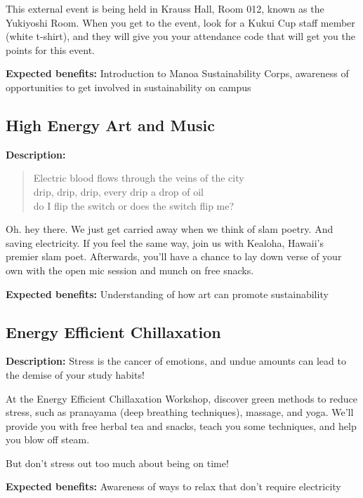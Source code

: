 This external event is being held in Krauss Hall, Room 012, known as the Yukiyoshi Room. When you get to the event, look for a Kukui Cup staff member (white t-shirt), and they will give you your attendance code that will get you the points for this event.

\vspace{2ex}
\textbf{Expected benefits:} Introduction to Manoa Sustainability Corps, awareness of opportunities to get involved in sustainability on campus


\subsection{High Energy Art and Music}

\textbf{Description:}

\begin{verse}
Electric blood flows through the veins of the city\\
drip, drip, drip, every drip a drop of oil\\
do I flip the switch or does the switch flip me?\\
\end{verse}

Oh. hey there. We just get carried away when we think of slam poetry. And saving electricity. If you feel the same way, join us with Kealoha, Hawaii's premier slam poet. Afterwards, you'll have a chance to lay down verse of your own with the open mic session and munch on free snacks.

\vspace{2ex}
\textbf{Expected benefits:} Understanding of how art can promote sustainability


\subsection{Energy Efficient Chillaxation}

\textbf{Description:} Stress is the cancer of emotions, and undue amounts can lead to the demise of your study habits!

At the Energy Efficient Chillaxation Workshop, discover green methods to reduce stress, such as pranayama (deep breathing techniques), massage, and yoga. We'll provide you with free herbal tea and snacks, teach you some techniques, and help you blow off steam.

But don't stress out too much about being on time!

\vspace{2ex}
\textbf{Expected benefits:} Awareness of ways to relax that don't require electricity


